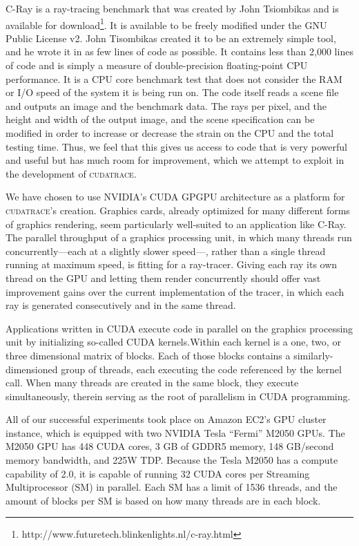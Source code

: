 \documentclass[12pt]{article}
\begin{document}
C-Ray is a ray-tracing benchmark that was created by John Tsiombikas and is available for download\footnote{{http://www.futuretech.blinkenlights.nl/c-ray.html}}. It is available to be freely modified under the GNU Public License v2. John Tisombikas created it to be an extremely simple tool, and he wrote it in as few lines of code as possible. It contains less than 2,000 lines of code and is simply a measure of double-precision floating-point CPU performance. It is a CPU core benchmark test that does not consider the RAM or I/O speed of the system it is being run on. The code itself reads a scene file and outputs an image and the benchmark data. The rays per pixel, and the height and width of the output image, and the scene specification can be modified in order to increase or decrease the strain on the CPU and the total testing time. Thus, we feel that this gives us access to code that is very powerful and useful but has much room for improvement, which we attempt to exploit in the development of \textsc{cudatrace}.

We have chosen to use NVIDIA's CUDA GPGPU architecture as a platform for \textsc{cudatrace}'s creation. Graphics cards, already optimized for many different forms of graphics rendering, seem particularly well-suited to an application like C-Ray. The parallel throughput of a graphics processing unit, in which many threads run concurrently---each at a slightly slower speed---, rather than a single thread running at maximum speed, is fitting for a ray-tracer. Giving each ray its own thread on the GPU and letting them render concurrently should offer vast improvement gains over the current implementation of the tracer, in which each ray is generated consecutively and in the same thread.

Applications written in CUDA execute code in parallel on the graphics processing unit by initializing so-called CUDA kernels.Within each kernel is a one, two, or three dimensional matrix of blocks. Each of those blocks contains a similarly-dimensioned group of threads, each executing the code referenced by the kernel call. When many threads are created in the same block, they execute simultaneously, therein serving as the root of parallelism in CUDA programming.

All of our successful experiments took place on Amazon EC2's GPU cluster instance, which is equipped with two NVIDIA Tesla “Fermi” M2050 GPUs. The M2050 GPU has 448 CUDA cores, 3 GB of GDDR5 memory, 148 GB/second memory bandwidth, and 225W TDP. Because the Tesla M2050 has a compute capability of 2.0, it is capable of running 32  CUDA cores per Streaming Multiprocessor (SM) in parallel. Each SM has a limit of 1536 threads, and the amount of blocks per SM is based on how many threads are in each block.
\end{document}
